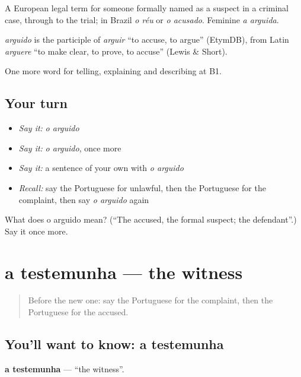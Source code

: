 A European legal term for someone formally named as a suspect in a criminal case, through to the trial; in Brazil \emph{o réu} or \emph{o acusado}. Feminine \emph{a arguida}.

\begin{cousinweb}
\emph{arguido} is the participle of \emph{arguir} \textquotedblleft{}to accuse, to argue\textquotedblright{} (EtymDB), from Latin \emph{arguere} \textquotedblleft{}to make clear, to prove, to accuse\textquotedblright{} (Lewis \& Short).
\end{cousinweb}

\begin{grammarlens}[title={What you've built}]
One more word for telling, explaining and describing at B1.
\end{grammarlens}

\subsection*{Your turn}
\begin{itemize}
\raggedright
  \item \emph{Say it:} \emph{o arguido}
  \item \emph{Say it:} \emph{o arguido}, once more
  \item \emph{Say it:} a sentence of your own with \emph{o arguido}
  \item \emph{Recall:} say the Portuguese for unlawful, then the Portuguese for the complaint, then say \emph{o arguido} again
\end{itemize}

\begin{tcolorbox}[breakable,colback=teal!4,colframe=teal!35!black,title={Before you move on}]
What does o arguido mean? (\textquotedblleft{}The accused, the formal suspect; the defendant\textquotedblright{}.) Say it once more.
\end{tcolorbox}
\section[a testemunha]{a testemunha — the witness}

\label{lesson:PT-C387-testemunha}



\begin{quote}
Before the new one: say the Portuguese for the complaint, then the Portuguese for the accused.
\end{quote}

\subsection*{You'll want to know: a testemunha}
\textbf{a testemunha} — \textquotedblleft{}the witness\textquotedblright{}.

